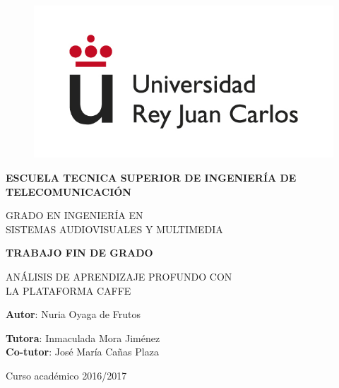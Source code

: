 \begin{titlepage}

\begin{center}

\begin{figure}[htb]
\begin{center}
	\includegraphics[width=0.6\linewidth]{figures/logo}
\end{center}
\end{figure}

\vspace{10mm}

\begin{Large}
\textbf{ESCUELA TECNICA SUPERIOR DE INGENIERÍA DE TELECOMUNICACIÓN}
\vspace{10mm}
\end{Large}

\begin{Large}
GRADO EN INGENIERÍA EN\\ \vspace{2mm} SISTEMAS AUDIOVISUALES Y MULTIMEDIA
\end{Large}

\vspace{10mm}

\begin{large}
\textbf{TRABAJO FIN DE GRADO}
\end{large}
\vspace{15mm}

\begin{LARGE}
ANÁLISIS DE APRENDIZAJE PROFUNDO CON\\ \vspace{2mm} LA
PLATAFORMA CAFFE
\end{LARGE}

\vspace{20mm}

\begin{large}
\textbf{Autor}: Nuria Oyaga de Frutos

\textbf{Tutora}: Inmaculada Mora Jiménez \\
\textbf{Co-tutor}: José María Cañas Plaza

\vspace{10mm}

Curso académico 2016/2017
\end{large}

\vspace{10mm}

\end{center}

\end{titlepage}

